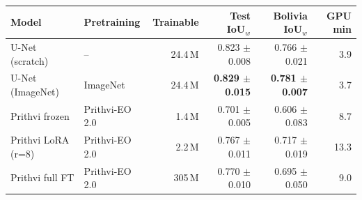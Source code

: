 \begin{tabular}{llrrrr}
\toprule
Model & Pretraining & Trainable & Test IoU$_w$ & Bolivia IoU$_w$ & GPU min \\
\midrule
U-Net (scratch) & -- & 24.4\,M & 0.823 $\pm$ 0.008 & 0.766 $\pm$ 0.021 & 3.9 \\
U-Net (ImageNet) & ImageNet & 24.4\,M & \textbf{0.829 $\pm$ 0.015} & \textbf{0.781 $\pm$ 0.007} & 3.7 \\
Prithvi frozen & Prithvi-EO 2.0 & 1.4\,M & 0.701 $\pm$ 0.005 & 0.606 $\pm$ 0.083 & 8.7 \\
Prithvi LoRA (r=8) & Prithvi-EO 2.0 & 2.2\,M & 0.767 $\pm$ 0.011 & 0.717 $\pm$ 0.019 & 13.3 \\
Prithvi full FT & Prithvi-EO 2.0 & 305\,M & 0.770 $\pm$ 0.010 & 0.695 $\pm$ 0.050 & 9.0 \\
\bottomrule
\end{tabular}
